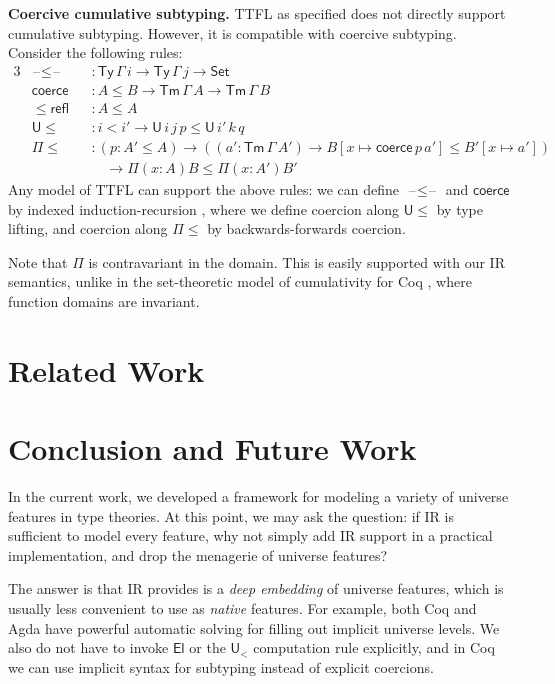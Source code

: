 \documentclass[a4paper,UKenglish,cleveref, autoref, thm-restate]{lipics-v2021}
\theoremstyle{remark}
\theoremstyle{definition}
\newcommand{\Seti}{\mathsf{Set}}
\newcommand{\Ty}{\mathsf{Ty}}
\newcommand{\Tm}{\mathsf{Tm}}
\newcommand{\U}{\mathsf{U}}
\newcommand{\El}{\mathsf{El}}
\newcommand{\blank}{\mathord{\hspace{1pt}\text{--}\hspace{1pt}}}
\renewcommand{\U}{\mathsf{U}}
\newcommand{\msf}[1]{\mathsf{#1}}
\newcommand{\ult}{\U_{<}}
\begin{document}
\textbf{Coercive cumulative subtyping.}
TTFL as specified does not directly support cumulative subtyping. However, it is
compatible with coercive subtyping. Consider the following rules:
\begin{alignat*}{3}
  &\blank\!\leq\!\blank &&: \Ty\,\Gamma\,i \to \Ty\,\Gamma\,j \to \Seti\\
  &\msf{coerce} &&: A \leq B \to \Tm\,\Gamma\,A \to \Tm\,\Gamma\,B\\
  &\leq\!\msf{refl} &&: A \leq A \\
  &\U\!\leq    &&: i < i' \to \U\,i\,j\,p \leq \U\,i'\,k\,q\\
  &\Pi\!\leq   &&: (p : A' \leq A) \to ((a' : \Tm\,\Gamma\,A')
  \to B[x \mapsto \msf{coerce}\,p\,a'] \leq B'[x \mapsto a'])\\
  & && \hspace{1em} \to \Pi(x : A) B \leq \Pi (x : A') B'
\end{alignat*}
Any model of TTFL can support the above rules: we can define
$\blank\!\leq\!\blank$ and $\msf{coerce}$ by indexed induction-recursion
\cite{indexedir}, where we define coercion along $\U\!\leq$ by type lifting, and
coercion along $\Pi\!\leq$ by backwards-forwards coercion.

Note that $\Pi$ is contravariant in the domain. This is easily supported
with our IR semantics, unlike in the set-theoretic model of cumulativity for Coq
\cite{timany2018cumulative}, where function domains are invariant.

\section{Related Work} \label{sec:related}


\section{Conclusion and Future Work} \label{sec:conclusion}

In the current work, we developed a framework for modeling a variety of universe
features in type theories. At this point, we may ask the question: if IR is
sufficient to model every feature, why not simply add IR support in a practical
implementation, and drop the menagerie of universe features?

The answer is that IR provides is a \emph{deep embedding} of universe features,
which is usually less convenient to use as \emph{native} features. For example,
both Coq and Agda have powerful automatic solving for filling out implicit
universe levels. We also do not have to invoke $\El$ or the $\ult$ computation
rule explicitly, and in Coq we can use implicit syntax for subtyping instead of
explicit coercions.
\end{document}
